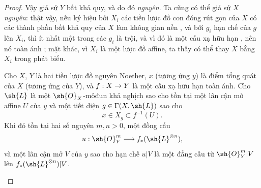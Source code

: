 \documentclass[oneside,10pt]{amsart}
\makeatletter
\newcommand{\ega@arrow}[2]{\mathchoice{#1}{#2}{#2}{#2}}
\renewcommand{\to}{\ega@arrow{\longrightarrow}{\rightarrow}}
\newcommand{\oldpage}[2][]{\marginnote{\normalfont\footnotesize\textbf{#1}~|~#2}\ignorespaces}
\let\EGAOriginalLabel\label
\renewcommand{\label}[1]{\phantomsection\EGAOriginalLabel{#1}}
\makeatother
\begin{document}
\begin{proof}
Vậy giả sử $Y$ bất khả quy, và do đó \emph{nguyên}.
Ta cũng có thể giả sử $X$ \emph{nguyên}:
thật vậy, nếu ký hiệu bởi $X_i$ các tiền lược đồ con đóng rút gọn của $X$ có các thành phần bất khả quy của $X$ làm không gian nền , và bởi $g_i$ hạn chế của $g$ lên $X_i$, thì ít nhất một trong các $g_i$ là trội, và vì đó là một cấu xạ hữu hạn , nên nó toàn ánh ;
mặt khác, vì $X_i$ là một lược đồ affine, ta thấy có thể thay $X$ bằng $X_i$ trong phát biểu.

\begin{lemma}[6.7.1.1]
\label{II.6.7.1.1}
Cho $X$, $Y$ là hai tiền lược đồ nguyên Noether, $x$ (tương ứng $y$) là điểm tổng quát của $X$ (tương ứng của $Y$), và $f:X\to Y$ là một cấu xạ hữu hạn toàn ánh.
Cho $\sh{L}$ là một $\sh{O}_X$-môđun khả nghịch sao cho tồn tại một lân cận mở affine $U$ của $y$ và một tiết diện $g\in\Gamma(X,\sh{L})$ sao cho
\oldpage[II]{137}
\[
  x\in X_g\subset f^{-1}(U).
\]
Khi đó tồn tại hai số nguyên $m,n>0$, một đồng cấu
\[
  u:\sh{O}_Y^m\to f_*(\sh{L}^{\otimes n}),
\]
và một lân cận mở $V$ của $y$ sao cho hạn chế $u|V$ là một đẳng cấu từ $\sh{O}_Y^m|V$ lên $f_*(\sh{L}^{\otimes n})|V$.
\end{lemma}


\end{proof}
\end{document}
